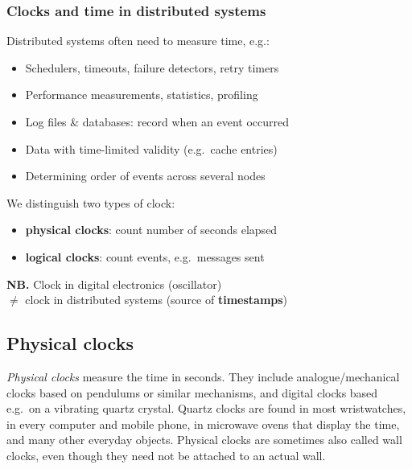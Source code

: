 \begin{frame}
    \label{s:clocks-intro}
    \frametitle{Clocks and time in distributed systems}
    Distributed systems often need to measure time, e.g.:
    \begin{itemize}
        \item Schedulers, timeouts, failure detectors, retry timers\pause
        \item Performance measurements, statistics, profiling\pause
        \item Log files \& databases: record when an event occurred\pause
        \item Data with time-limited validity (e.g.\ cache entries)\pause
        \item Determining order of events across several nodes\\[1em]\pause
    \end{itemize}
    We distinguish two types of clock:
    \begin{itemize}
        \item \textbf{physical clocks}: count number of seconds elapsed
        \item \textbf{logical clocks}: count events, e.g.\ messages sent\\[1em]
    \end{itemize}\pause
    \textbf{NB.} Clock in digital electronics (oscillator)\\$\neq$ clock in distributed systems (source of \textbf{timestamps})
\end{frame}
\label{l:clocks-intro}


\subsection{Physical clocks}\label{sec:physical-clocks}

\emph{Physical clocks} measure the time in seconds.
They include analogue/mechanical clocks based on pendulums or similar mechanisms, and digital clocks based e.g.\ on a vibrating quartz crystal.
Quartz clocks are found in most wristwatches, in every computer and mobile phone, in microwave ovens that display the time, and many other everyday objects.
Physical clocks are sometimes also called wall clocks, even though they need not be attached to an actual wall.

